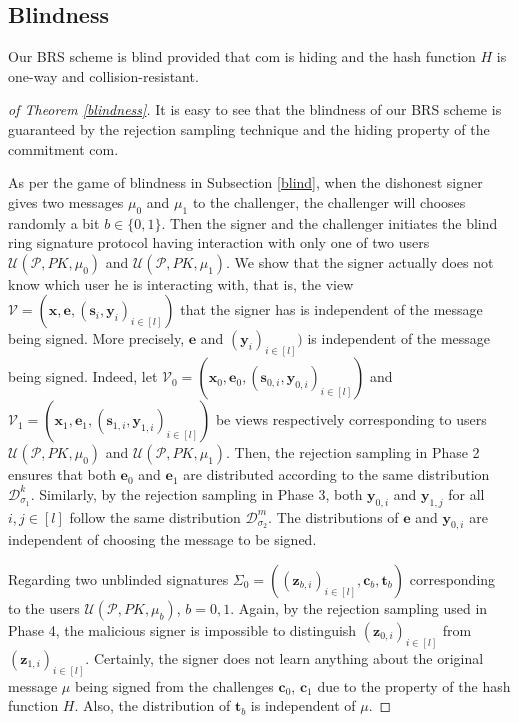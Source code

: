 \documentclass[runningheads]{llncs}
\begin{document}
\subsection{Blindness}

\begin{theorem}[Blindness] \label{blindness} 
	Our \textsf{BRS} scheme is blind provided that \textsf{com} is hiding and the hash function $H$ is one-way and collision-resistant.
\end{theorem}

\begin{proof}[of Theorem \ref{blindness}] It is easy to see that the blindness of our \textsf{BRS} scheme is guaranteed by the rejection sampling technique and the hiding property of the commitment \textsf{com}.  
	
	As per the game of blindness in Subsection \ref{blind}, when the dishonest signer gives two messages $\mu_0$ and $\mu_1$ to the challenger, the challenger will chooses randomly a bit $b \in \{0,1\}$. Then the signer and the challenger initiates the blind ring signature protocol having interaction with only one of two users $\mathcal{U}(\mathcal{P}, PK, \mu_0)$ and $\mathcal{U}(\mathcal{P}, PK, \mu_{1})$. We show that the signer actually does not know which user he is interacting with, that is, the view $\mathcal{V}=(\mathbf{x},\mathbf{e}, (\mathbf{s}_i, \mathbf{y}_i)_{i \in [l]})$ that the signer has is independent of the message being signed. More precisely, $\mathbf{e}$ and $(\mathbf{y}_i)_{i \in [l]})$ is independent of the message being signed. 	Indeed, let $\mathcal{V}_0=(\mathbf{x}_0,\mathbf{e}_0, (\mathbf{s}_{0,i}, \mathbf{y}_{0,i})_{i \in [l]})$ and $\mathcal{V}_1=(\mathbf{x}_1,\mathbf{e}_1, (\mathbf{s}_{1,i}, \mathbf{y}_{1,i})_{i \in [l]})$ be views respectively corresponding to users $\mathcal{U}(\mathcal{P}, PK, \mu_0)$ and $\mathcal{U}(\mathcal{P}, PK, \mu_{1})$.
	Then, the rejection sampling in Phase 2 ensures that both $\mathbf{e}_0$ and $\mathbf{e}_1$ are distributed according to the same distribution $\mathcal{D}_{\sigma_1}^k$. Similarly, by the rejection sampling in Phase 3, both $\mathbf{y}_{0,i}$ and $\mathbf{y}_{1,j}$ for all $i, j \in [l]$ follow the same distribution $\mathcal{D}_{\sigma_2}^m$. The distributions of $\mathbf{e}$ and $\mathbf{y}_{0,i}$ are independent of choosing the message to be signed.
	
	Regarding  two unblinded signatures  $ \Sigma_0=((\mathbf{z}_{b,i})_{i \in [l]}, \mathbf{c}_b, \mathbf{t}_b)$ corresponding to the users $\mathcal{U}(\mathcal{P}, PK, \mu_b)$, $b=0,1$. Again, by the rejection sampling used in Phase 4, the malicious signer is impossible to distinguish $(\mathbf{z}_{0,i})_{i \in [l]}$ from $(\mathbf{z}_{1,i})_{i \in [l]}$. Certainly, the signer does not learn anything about the original message $\mu$ being signed from the challenges $\mathbf{c}_0$, $\mathbf{c}_1$ due to the property of the hash function $H$. Also, the distribution of $\mathbf{t}_b$ is independent of $\mu$.
	

\end{proof}
\end{document}
